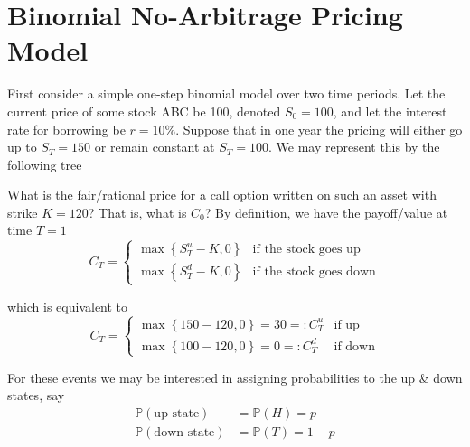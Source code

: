 \documentclass[12pt]{article}
\newlength\tindent
\renewcommand{\indent}{\hspace*{\tindent}}
\renewcommand{\P}{\mathbb P}
\begin{document}
\section{Binomial No-Arbitrage Pricing Model}

\indent First consider a simple one-step binomial model over two time periods. Let the current price of some stock ABC be 100, denoted $S_0 = 100$, and let the interest rate for borrowing be $r = 10\%$. Suppose that in one year the pricing will either go up to $S_T = 150$ or remain constant at $S_T = 100$. We may represent this by the following tree \\

\begin{center}
\end{center}

\indent What is the fair/rational price for a call option written on such an asset with strike $K = 120$? That is, what is $C_0$? By definition, we have the payoff/value at time $T = 1$
\begin{equation*}
	C_T = 
	\begin{cases}
		\max \left\{S^u_T - K, 0\right\} & \text{if the stock goes up} \\
		\max \left\{S^d_T - K, 0\right\} & \text{if the stock goes down}
	\end{cases}
\end{equation*}

which is equivalent to
\begin{equation*}
	C_T = 
	\begin{cases}
		\max \left\{150 - 120, 0\right\} = 30 =: C^u_T & \text{if up} \\
		\max \left\{100 - 120, 0\right\} = 0 =: C^d_T & \text{if down}
	\end{cases}
\end{equation*}

\indent For these events we may be interested in assigning probabilities to the up \& down states, say
\begin{align*}
	\P\left( \text{up state} \right) &= \P(H) = p \\
	\P\left( \text{down state} \right) &= \P(T) = 1 - p
\end{align*}
\end{document}
